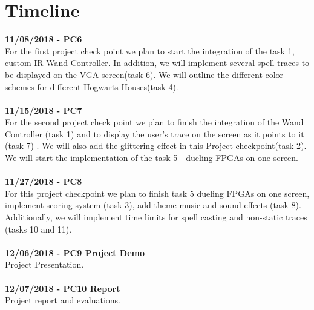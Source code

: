 \documentclass[letterpaper]{article} %
\begin{document}
\section{Timeline}
\textbf{11/08/2018 - PC6}\\
For the first project check point we plan to start the integration of the task 1, custom IR Wand Controller. In addition, we will implement several spell traces to be displayed on the VGA screen(task 6). We will outline the different color schemes for different Hogwarts Houses(task 4).\\
\\
\textbf{11/15/2018 - PC7}\\
For the second project check point we plan to finish the integration of the Wand Controller (task 1) and to display the user's trace on the screen as it points to it (task 7) . We will also add the glittering effect in this Project checkpoint(task 2). We will start the implementation of the task 5 - dueling FPGAs on one screen.\\
\\
\textbf{11/27/2018 - PC8}\\
For this project checkpoint we plan to finish task 5 dueling FPGAs on one screen, implement scoring system (task 3), add theme music and sound effects (task 8). Additionally, we will implement time limits for spell casting and non-static traces (tasks 10 and 11).\\
\\
\textbf{12/06/2018 - PC9 Project Demo}\\
Project Presentation.\\
\\
\textbf{12/07/2018 - PC10 Report}\\
Project report and evaluations.\\
\\
\end{document}
